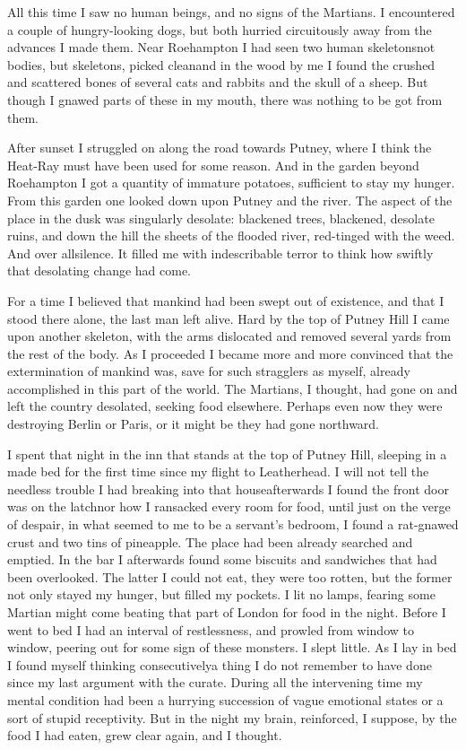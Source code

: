 All this time I saw no human beings, and no signs of the Martians.
I encountered a couple of hungry-looking dogs, but both hurried
circuitously away from the advances I made them. Near Roehampton I
had seen two human skeletons\dash{}not bodies, but skeletons, picked
clean\dash{}and in the wood by me I found the crushed and scattered
bones of several cats and rabbits and the skull of a sheep. But
though I gnawed parts of these in my mouth, there was nothing to be
got from them.

After sunset I struggled on along the road towards Putney, where I
think the Heat-Ray must have been used for some reason. And in the
garden beyond Roehampton I got a quantity of immature potatoes,
sufficient to stay my hunger. From this garden one looked down upon
Putney and the river. The aspect of the place in the dusk was
singularly desolate: blackened trees, blackened, desolate ruins,
and down the hill the sheets of the flooded river, red-tinged with
the weed. And over all\dash{}silence. It filled me with indescribable
terror to think how swiftly that desolating change had come.

For a time I believed that mankind had been swept out of existence,
and that I stood there alone, the last man left alive. Hard by the
top of Putney Hill I came upon another skeleton, with the arms
dislocated and removed several yards from the rest of the body. As
I proceeded I became more and more convinced that the extermination
of mankind was, save for such stragglers as myself, already
accomplished in this part of the world. The Martians, I thought,
had gone on and left the country desolated, seeking food elsewhere.
Perhaps even now they were destroying Berlin or Paris, or it might
be they had gone northward.

I spent that night in the inn that stands at the top of Putney
Hill, sleeping in a made bed for the first time since my flight to
Leatherhead. I will not tell the needless trouble I had breaking
into that house\dash{}afterwards I found the front door was on the
latch\dash{}nor how I ransacked every room for food, until just on the
verge of despair, in what seemed to me to be a servant's bedroom, I
found a rat-gnawed crust and two tins of pineapple. The place had
been already searched and emptied. In the bar I afterwards found
some biscuits and sandwiches that had been overlooked. The latter I
could not eat, they were too rotten, but the former not only stayed
my hunger, but filled my pockets. I lit no lamps, fearing some
Martian might come beating that part of London for food in the
night. Before I went to bed I had an interval of restlessness, and
prowled from window to window, peering out for some sign of these
monsters. I slept little. As I lay in bed I found myself thinking
consecutively\dash{}a thing I do not remember to have done since my last
argument with the curate. During all the intervening time my mental
condition had been a hurrying succession of vague emotional states
or a sort of stupid receptivity. But in the night my brain,
reinforced, I suppose, by the food I had eaten, grew clear again,
and I thought.


